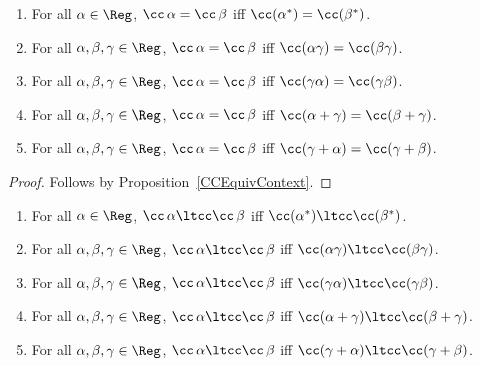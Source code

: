 \begin{proposition}
\begin{enumerate}[\quad(1)]
\item For all $\alpha\in\Reg$, $\cc\,\alpha = \cc\,\beta$
  iff $\cc(\alpha^*) = \cc(\beta^*)$.

\item For all $\alpha,\beta,\gamma\in\Reg$, $\cc\,\alpha = \cc\,\beta$
  iff $\cc(\alpha\gamma) = \cc(\beta\gamma)$.

\item For all $\alpha,\beta,\gamma\in\Reg$, $\cc\,\alpha = \cc\,\beta$
  iff $\cc(\gamma\alpha) = \cc(\gamma\beta)$.

\item For all $\alpha,\beta,\gamma\in\Reg$, $\cc\,\alpha = \cc\,\beta$
  iff $\cc(\alpha + \gamma) = \cc(\beta + \gamma)$.

\item For all $\alpha,\beta,\gamma\in\Reg$, $\cc\,\alpha = \cc\,\beta$
  iff $\cc(\gamma + \alpha) = \cc(\gamma + \beta)$.
\end{enumerate}
\end{proposition}

\begin{proof}
Follows by Proposition~\ref{CCEquivContext}.
\end{proof}

\begin{proposition}
\begin{enumerate}[\quad(1)]
\item For all $\alpha\in\Reg$, $\cc\,\alpha\ltcc\cc\,\beta$
  iff $\cc(\alpha^*)\ltcc\cc(\beta^*)$.

\item For all $\alpha,\beta,\gamma\in\Reg$, $\cc\,\alpha\ltcc\cc\,\beta$
  iff $\cc(\alpha\gamma)\ltcc\cc(\beta\gamma)$.

\item For all $\alpha,\beta,\gamma\in\Reg$, $\cc\,\alpha\ltcc\cc\,\beta$
  iff $\cc(\gamma\alpha)\ltcc\cc(\gamma\beta)$.

\item For all $\alpha,\beta,\gamma\in\Reg$, $\cc\,\alpha\ltcc\cc\,\beta$
  iff $\cc(\alpha + \gamma)\ltcc\cc(\beta + \gamma)$.

\item For all $\alpha,\beta,\gamma\in\Reg$, $\cc\,\alpha\ltcc\cc\,\beta$
  iff $\cc(\gamma + \alpha)\ltcc\cc(\gamma + \beta)$.
\end{enumerate}
\end{proposition}

